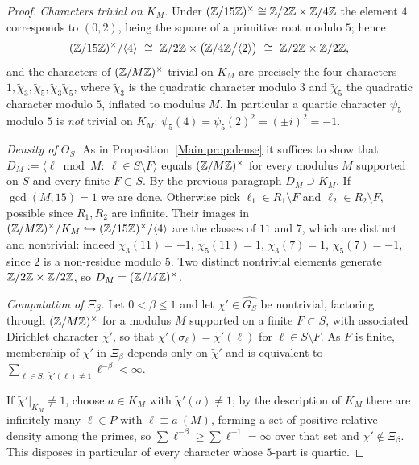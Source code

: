\begin{proof}
\emph{Characters trivial on $K_M$.} Under
$(\mathbb{Z}/15\mathbb{Z})^\times\cong\mathbb{Z}/2\mathbb{Z}\times\mathbb{Z}/4\mathbb{Z}$ the element $4$ corresponds to
$(0,2)$, being the square of a primitive root modulo $5$; hence
\[
(\Z/15\Z)^\times/\langle4\rangle\ \cong\ \Z/2\Z\times\bigl(\Z/4\Z\big/\langle2\rangle\bigr)\ \cong\ \Z/2\Z\times\Z/2\Z,
\]
and the characters of $(\mathbb{Z}/M\mathbb{Z})^\times$ trivial on $K_M$ are precisely the four
characters $1,\tilde\chi_3,\tilde\chi_5,\tilde\chi_3\tilde\chi_5$, where
$\tilde\chi_3$ is the quadratic character modulo $3$ and $\tilde\chi_5$ the
quadratic character modulo $5$, inflated to modulus $M$. In particular a
quartic character $\tilde\psi_5$ modulo $5$ is \emph{not} trivial on $K_M$:
$\tilde\psi_5(4)=\tilde\psi_5(2)^2=(\pm i)^2=-1$.

\emph{Density of $\Theta_S$.} As in Proposition~\ref{Main:prop:dense} it suffices to
show that $D_M:=\langle\ell\bmod M:\ \ell\in S\setminus F\rangle$ equals
$(\mathbb{Z}/M\mathbb{Z})^\times$ for every modulus $M$ supported on $S$ and every finite
$F\subset S$. By the previous paragraph $D_M\supseteq K_M$. If $\gcd(M,15)=1$
we are done. Otherwise pick $\ell_1\in R_1\setminus F$ and $\ell_2\in R_2\setminus F$,
possible since $R_1,R_2$ are infinite. Their images in
$(\mathbb{Z}/M\mathbb{Z})^\times/K_M\hookrightarrow(\mathbb{Z}/15\mathbb{Z})^\times/\langle4\rangle$ are the
classes of $11$ and $7$, which are distinct and nontrivial: indeed
$\tilde\chi_3(11)=-1$, $\tilde\chi_5(11)=1$, $\tilde\chi_3(7)=1$,
$\tilde\chi_5(7)=-1$, since $2$ is a non-residue modulo $5$. Two distinct
nontrivial elements generate $\mathbb{Z}/2\mathbb{Z}\times\mathbb{Z}/2\mathbb{Z}$, so $D_M=(\mathbb{Z}/M\mathbb{Z})^\times$.

\emph{Computation of $\Xi_\beta$.} Let $0<\beta\le1$ and let
$\chi'\in\widehat{G_S}$ be nontrivial, factoring through $(\mathbb{Z}/M\mathbb{Z})^\times$ for
a modulus $M$ supported on a finite $F\subset S$, with associated Dirichlet
character $\tilde\chi'$, so that $\chi'(\sigma_\ell)=\tilde\chi'(\ell)$ for
$\ell\in S\setminus F$. As $F$ is finite, membership of $\chi'$ in $\Xi_\beta$
depends only on $\tilde\chi'$ and is equivalent to
$\sum_{\ell\in S,\ \tilde\chi'(\ell)\neq1}\ell^{-\beta}<\infty$.

If $\tilde\chi'|_{K_M}\neq1$, choose $a\in K_M$ with $\tilde\chi'(a)\neq1$; by
the description of $K_M$ there are infinitely many $\ell\in P$ with
$\ell\equiv a\ (M)$, forming a set of positive relative density among the
primes, so $\sum\ell^{-\beta}\ge\sum\ell^{-1}=\infty$ over that set and
$\chi'\notin\Xi_\beta$. This disposes in particular of every character whose
$5$-part is quartic.


\end{proof}
